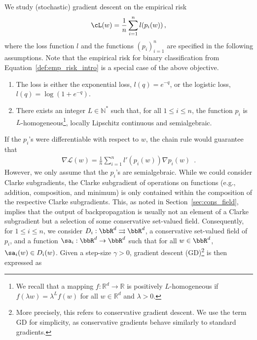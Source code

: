 We study (stochastic) gradient descent on the empirical risk
\begin{equation*}
\cL(w) = \frac{1}{n}\sum_{i=1}^n l(p_i(w))\, ,
\end{equation*}
where the loss function $l$ and the functions  $(p_i)_{i=1}^n$  are specified in the following assumptions. Note that the empirical risk for binary classification from Equation~\eqref{def:emp_risk_intro} is a special case of the above objective.

\begin{assumption}\label{hyp:loss_exp_log}\phantom{=}
  \begin{enumerate}[label=\roman*)]
    \item The loss is either the exponential loss, $l(q) = e^{-q}$, or the logistic loss, $l(q) = \log(1{+}e^{-q})$.
    \item There exists an integer $L \in \mathbb{N}^*$  such that, for all $1 \leq i \leq n$, the function $p_i$ is $L$-homogeneous\footnote{We recall that a mapping $f : \mathbb{R}^d \rightarrow \mathbb{R}$ is positively $L$-homogeneous if $f(\lambda w) = \lambda^L f(w)$ for all $w \in \mathbb{R}^d$ and $\lambda >0$.}, locally Lipschitz continuous and semialgebraic.
  \end{enumerate}
\end{assumption}
If the $p_i$'s were differentiable with respect to $w$, the chain rule would guarantee that
\begin{align*}
\nabla \mathcal{L}(w) = \frac{1}{n}\sum_{i=1}^n  l'(p_i(w)) \nabla p_i(w)\enspace.
\end{align*}
However, we only assume that the $p_i$'s are semialgebraic. While we could consider Clarke subgradients, the Clarke subgradient of operations on functions (e.g., addition, composition, and minimum) is only contained within the composition of the respective Clarke subgradients. This, as noted in Section~\ref{sec:cons_field}, implies that the output of backpropagation is usually not an element of a Clarke subgradient but a selection of some conservative set-valued field.
Consequently, for $1\leq i \leq n$, we consider $D_i : \bbR^d \rightrightarrows\bbR^d$, a conservative set-valued field of $p_i$, and a function $\sa_i : \bbR^d \rightarrow \bbR^d$ such that for all $w \in \bbR^d$, $\sa_i(w) \in D_i(w)$. Given a step-size $\gamma >0$, gradient descent (GD)\footnote{More precisely, this refers to conservative gradient descent. We use the term GD for simplicity, as conservative gradients behave similarly to standard gradients.} is then expressed as
